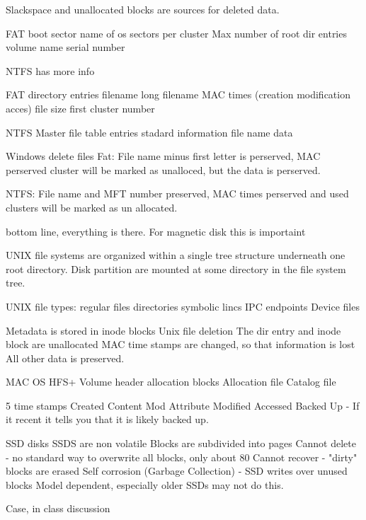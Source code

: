     Slackspace and unallocated blocks are sources for deleted data.

    FAT boot sector
    name of os
    sectors per cluster
    Max number of root dir entries
    volume name
    serial number

    NTFS has more info
    
    FAT directory entries
        filename
        long filename
        MAC times (creation modification acces)
        file size
        first cluster number

    NTFS Master file table entries
        stadard information
        file name
        data
    
    Windows delete files
    Fat: File name minus first letter is perserved, MAC perserved
    cluster will be marked as unalloced, but the data is perserved.

    NTFS: File name and MFT number preserved,
    MAC times perserved and used clusters will be marked as un allocated.

    bottom line, everything is there.
    For magnetic disk this is importaint

    UNIX
    file systems are organized within a single tree structure
    underneath one root directory.
    Disk partition are mounted at some directory in the file
    system tree.

    UNIX file types:
    regular files
    directories
    symbolic lincs
    IPC endpoints
    Device files

    Metadata is stored in inode blocks
    Unix file deletion
    The dir entry and inode block are unallocated
    MAC time stamps are changed, so that information is lost
    All other data is preserved.

    MAC OS
    HFS+
    Volume header
    allocation blocks
    Allocation file
    Catalog file

    5 time stamps
    Created
    Content Mod
    Attribute Modified
    Accessed
    Backed Up - If it recent it tells you that it is likely backed up.

    SSD disks
    SSDS are non volatile
    Blocks are subdivided into pages
    Cannot delete - no standard way to overwrite all blocks, only
    about 80%
    Cannot recover - "dirty" blocks are erased
    Self corrosion (Garbage Collection) - SSD writes over unused blocks
    Model dependent, especially older SSDs may not do this.

    Case, in class discussion

